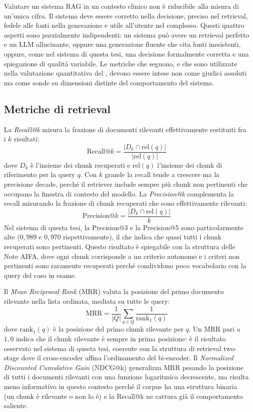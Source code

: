 Valutare un sistema RAG in un contesto clinico non è riducibile alla misura
di un'unica cifra. Il sistema deve essere corretto nella decisione, preciso
nel retrieval, fedele alle fonti nella generazione e utile all'utente nel
complesso. Questi quattro aspetti sono parzialmente indipendenti: un sistema
può avere un retrieval perfetto e un LLM allucinante, oppure una generazione
fluente che cita fonti inesistenti, oppure, come nel sistema di questa tesi,
una decisione formalmente corretta e una spiegazione di qualità variabile.
Le metriche che seguono, e che sono utilizzate nella valutazione quantitativa
del , devono essere intese non come giudici assoluti ma
come sonde su dimensioni distinte del comportamento del sistema.

\subsection{Metriche di retrieval}
\label{subsec:metr-retrieval}

La \emph{Recall@k} misura la frazione di documenti rilevanti effettivamente
restituiti fra i $k$ risultati:
\[
  \text{Recall@}k = \frac{|D_k \cap \text{rel}(q)|}{|\text{rel}(q)|}
\]
dove $D_k$ è l'insieme dei chunk recuperati e $\text{rel}(q)$ l'insieme dei
chunk di riferimento per la query $q$. Con $k$ grande la recall tende a crescere ma la
precisione decade, perché il retriever include sempre più chunk non pertinenti
che occupano la finestra di contesto del modello. La \emph{Precision@k}
complementa la recall misurando la frazione di chunk recuperati che sono
effettivamente rilevanti:
\[
  \text{Precision@}k = \frac{|D_k \cap \text{rel}(q)|}{k}
\]
Nel sistema di questa tesi, la Precision@3 e la Precision@5 sono
particolarmente alte ($0{,}989$ e $0{,}970$ rispettivamente), il che indica
che quasi tutti i chunk recuperati sono pertinenti. Questo risultato è
spiegabile con la struttura delle Note AIFA, dove ogni chunk corrisponde a
un criterio autonomo e i criteri non pertinenti sono raramente recuperati
perché condividono poco vocabolario con la query del caso in esame.

Il \emph{Mean Reciprocal Rank} (MRR) valuta la posizione del primo documento
rilevante nella lista ordinata, mediata su tutte le query:
\[
  \text{MRR} = \frac{1}{|Q|} \sum_{q \in Q} \frac{1}{\text{rank}_1(q)}
\]
dove $\text{rank}_1(q)$ è la posizione del primo chunk rilevante per $q$.
Un MRR pari a $1{,}0$ indica che il chunk rilevante è sempre in prima
posizione: è il risultato osservato nel sistema di questa tesi, coerente
con la struttura di retrieval two-stage dove il cross-encoder affina
l'ordinamento del bi-encoder. Il \emph{Normalized Discounted Cumulative Gain}
(NDCG@k) generalizza MRR pesando la posizione di tutti i documenti rilevanti
con una funzione logaritmica decrescente, ma risulta meno informativo in
questo contesto perché il corpus ha una struttura binaria (un chunk è
rilevante o non lo è) e la Recall@k ne cattura già il comportamento saliente.

